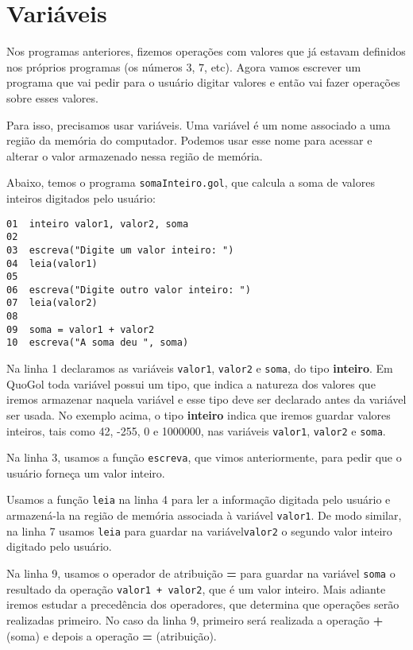 \documentclass{report}
\newcommand{\Qgol}{QuoGol\;}
\begin{document}
\section{Variáveis}

Nos programas anteriores, fizemos operações com valores que
já estavam definidos nos próprios programas (os números $3$, $7$, etc).
Agora vamos escrever um programa que vai pedir para o usuário
digitar valores e então vai fazer operações sobre esses valores.

Para isso, precisamos usar variáveis. Uma variável é um nome associado
a uma região da memória do computador. Podemos usar esse nome para
acessar e alterar o valor armazenado nessa região de memória. 

Abaixo, temos o programa \texttt{somaInteiro.gol}, que
calcula a soma de valores inteiros digitados pelo usuário:
%
\begin{verbatim}
01  inteiro valor1, valor2, soma
02
03  escreva("Digite um valor inteiro: ")
04  leia(valor1)
05
06  escreva("Digite outro valor inteiro: ")
07  leia(valor2)
08
09  soma = valor1 + valor2
10  escreva("A soma deu ", soma)
\end{verbatim}
%
Na linha 1 declaramos as variáveis \texttt{valor1}, \texttt{valor2}
e \texttt{soma}, do tipo \textbf{inteiro}. Em \Qgol
toda variável possui um tipo, que indica a natureza dos valores que
iremos armazenar naquela variável e esse tipo deve ser declarado antes
da variável ser usada. No exemplo acima, o tipo \textbf{inteiro} indica
que iremos guardar valores inteiros, tais como 42, -255, 0 e 1000000,
nas variáveis \texttt{valor1}, \texttt{valor2} e \texttt{soma}.
 
Na linha 3, usamos a função \texttt{escreva}, que vimos anteriormente,
para pedir que o usuário forneça um valor inteiro.

Usamos a função \texttt{leia} na linha 4 para ler a informação digitada
pelo usuário e armazená-la na região de memória associada à variável
\texttt{valor1}. De modo similar, na linha 7 usamos \texttt{leia}
para guardar na variável\texttt{valor2} o segundo valor inteiro
digitado pelo usuário.

Na linha 9, usamos o operador de atribuição \textbf{=} para guardar
na variável \texttt{soma} o resultado da operação \texttt{valor1 + valor2},
que é um valor inteiro. Mais adiante iremos estudar a precedência dos
operadores, que determina que operações serão realizadas primeiro.
No caso da linha 9, primeiro será realizada a operação \textbf{+} (soma)
e depois a operação \textbf{=} (atribuição).
\end{document}
